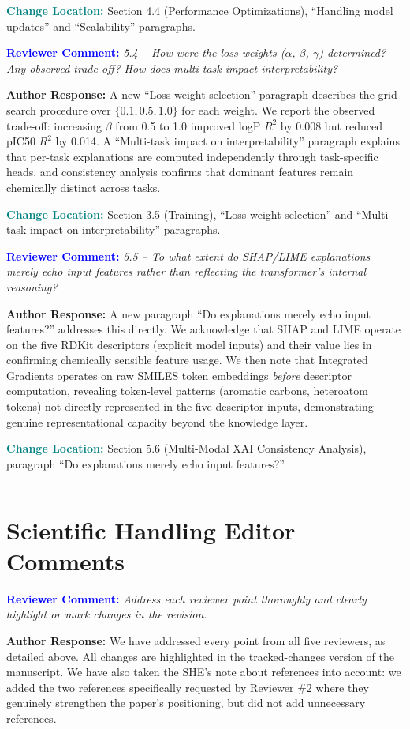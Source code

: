 \documentclass[12pt]{article}
\newcommand{\RC}[1]{\textbf{\textcolor{blue}{Reviewer Comment:}} \textit{#1}\vspace{0.3em}}
\newcommand{\AR}[1]{\textbf{Author Response:} #1\vspace{0.8em}}
\newcommand{\CH}[1]{\textbf{\textcolor{teal}{Change Location:}} #1\vspace{0.5em}}
\begin{document}
\CH{Section 4.4 (Performance Optimizations), ``Handling model updates'' and ``Scalability'' paragraphs.}

\bigskip

\RC{5.4 -- How were the loss weights ($\alpha$, $\beta$, $\gamma$) determined? Any observed trade-off? How does multi-task impact interpretability?}

\AR{A new ``Loss weight selection'' paragraph describes the grid search procedure over $\{0.1, 0.5, 1.0\}$ for each weight. We report the observed trade-off: increasing $\beta$ from 0.5 to 1.0 improved logP $R^2$ by 0.008 but reduced pIC50 $R^2$ by 0.014. A ``Multi-task impact on interpretability'' paragraph explains that per-task explanations are computed independently through task-specific heads, and consistency analysis confirms that dominant features remain chemically distinct across tasks.}

\CH{Section 3.5 (Training), ``Loss weight selection'' and ``Multi-task impact on interpretability'' paragraphs.}

\bigskip

\RC{5.5 -- To what extent do SHAP/LIME explanations merely echo input features rather than reflecting the transformer's internal reasoning?}

\AR{A new paragraph ``Do explanations merely echo input features?'' addresses this directly. We acknowledge that SHAP and LIME operate on the five RDKit descriptors (explicit model inputs) and their value lies in confirming chemically sensible feature usage. We then note that Integrated Gradients operates on raw SMILES token embeddings \emph{before} descriptor computation, revealing token-level patterns (aromatic carbons, heteroatom tokens) not directly represented in the five descriptor inputs, demonstrating genuine representational capacity beyond the knowledge layer.}

\CH{Section 5.6 (Multi-Modal XAI Consistency Analysis), paragraph ``Do explanations merely echo input features?''}

\bigskip
\hrule
\bigskip

\section*{Scientific Handling Editor Comments}

\RC{Address each reviewer point thoroughly and clearly highlight or mark changes in the revision.}

\AR{We have addressed every point from all five reviewers, as detailed above. All changes are highlighted in the tracked-changes version of the manuscript. We have also taken the SHE's note about references into account: we added the two references specifically requested by Reviewer \#2 where they genuinely strengthen the paper's positioning, but did not add unnecessary references.}
\end{document}
